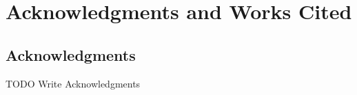 \documentclass[smallextended]{svjour3}
\newcommand{\todo}[1]{{\huge\color{red}TODO {#1}}}
\begin{document}
\section{Acknowledgments and Works Cited}
\label{sec:10}
\subsection{Acknowledgments}
\todo{Write Acknowledgments} 
\begin{acknowledgements}
\end{acknowledgements}

\end{document}
